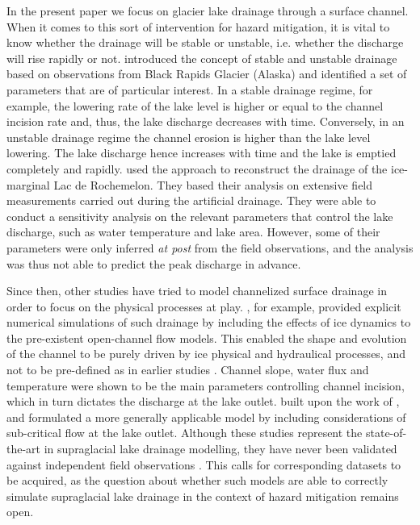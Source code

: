 In the present paper we focus on glacier lake drainage through a surface channel. When it comes to this sort of intervention for hazard mitigation, it is vital to know whether the drainage will be stable or unstable, i.e. whether the discharge will rise rapidly or not. \cite{Raymond&Nolan2000} introduced the concept of stable and unstable drainage based on observations from Black Rapids Glacier (Alaska) and identified a set of parameters that are of particular interest. In a stable drainage regime, for example, the lowering rate of the lake level is higher or equal to the channel incision rate and, thus, the lake discharge decreases with time. Conversely, in an unstable drainage regime the channel erosion is higher than the lake level lowering. The lake discharge hence increases with time and the lake is emptied completely and rapidly. \cite{Vincent&al2010} used the \cite{Raymond&Nolan2000} approach to reconstruct the drainage of the ice-marginal Lac de Rochemelon. They based their analysis on extensive field measurements carried out during the artificial drainage. They were able to conduct a sensitivity analysis on the relevant parameters that control the lake discharge, such as water temperature and lake area. However, some of their parameters were only inferred \textit{at post} from the field observations, and the analysis was thus not able to predict the peak discharge in advance.

Since then, other studies have tried to model channelized surface drainage in order to focus on the physical processes at play. \cite{Jarosch&Gudmundsson2012}, for example, provided explicit numerical simulations of such drainage by including the effects of ice dynamics to the pre-existent open-channel flow models. This enabled the shape and evolution of the channel to be purely driven by ice physical and hydraulical processes, and not to be pre-defined as in earlier studies \citep[e.g.][]{Walder&Costa1996,Raymond&Nolan2000}. Channel slope, water flux and temperature were shown to be the main parameters controlling channel incision, which in turn dictates the discharge at the lake outlet. \cite{Kingslake&al2015} built upon the work of \cite{Raymond&Nolan2000}, and formulated a more generally applicable model by including considerations of sub-critical flow at the lake outlet. Although these studies represent the state-of-the-art in supraglacial lake drainage modelling, they have never been validated against independent field observations \citep{Pitcher&Smith2019}. This calls for corresponding datasets to be acquired, as the question about whether such models are able to correctly simulate supraglacial lake drainage in the context of hazard mitigation remains open.

